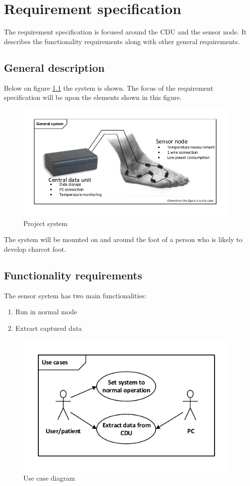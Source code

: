 \chapter{Requirement specification}

The requirement specification is focused around the CDU and the sensor node. It describes the functionality requirements along with other general requirements.

\section{General description}
Below on figure \ref{fig:project_system} the system is shown. The focus of the requirement specification will be upon the elements shown in this figure.

\begin{figure}[H]
	\centering
	\includegraphics[width=.9\textwidth]{billeder/7requirementspec/GeneralSystem}
	\caption{Project system}
	\label{fig:project_system}
\end{figure}

The system will be mounted on and around the foot of a person who is likely to develop charcot foot. 

\section{Functionality requirements}
The sensor system has two main functionalities:
\begin{enumerate}
	\item Run in normal mode
	\item Extract captured data
\end{enumerate}

\begin{figure}[H]
	\centering
	\includegraphics[width=.7\textwidth]{billeder/7requirementspec/usecase_vector}
	\caption{Use case diagram}
\end{figure}


